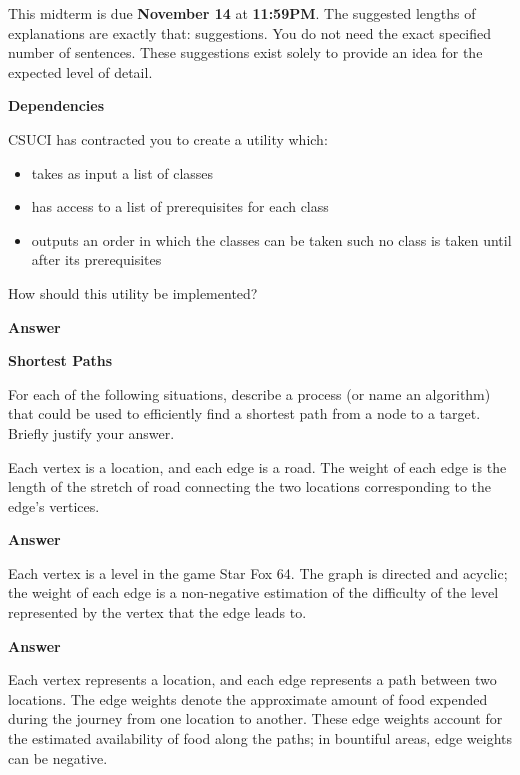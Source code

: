 \documentclass[12pt,twoside]{article}
\newcommand{\answer}{
 \par\medskip
 \textbf{Answer}
}
\newcommand{\answerI}{ \answer

}
\newcommand{\answerIIa}{ \answer

}
\newcommand{\answerIIb}{ \answer

}
\newcommand{\theproblemsetnum}{2}
\newcommand{\releasedate}{November 11, 2020}
\newcommand{\partaduedate}{November 14}
\begin{document}
\handout{Midterm \theproblemsetnum}{\releasedate}

This midterm is due {\bf \partaduedate} at
{\bf 11:59PM}. The suggested lengths of explanations are exactly that: suggestions.
You do not need the exact specified number of sentences. These suggestions
exist solely to provide an idea for the expected level of detail.

\medskip

\hrulefill

\begin{problems}

\problem {} \textbf{Dependencies}

CSUCI has contracted you to create a utility which:

\begin{itemize}
\item takes as input a list of classes
\item has access to a list of prerequisites for each class
\item outputs an order in which the classes can be taken
  such no class is taken until after its prerequisites
\end{itemize}

How should this utility be implemented?

\answerI


\problem {} \textbf{Shortest Paths}

For each of the following situations, describe a  process
(or name an algorithm) that could be used to efficiently 
find a shortest path from a node to a target.
Briefly justify your answer.

\begin{problemparts}
  
  \problempart {}
  Each vertex is a location, and each edge is a road. The weight
  of each edge is the length of the stretch of road connecting
  the two locations corresponding to the edge's vertices.
  
  \answerIIa

  \problempart {}
  Each vertex is a level in the game Star Fox 64. The graph is
  directed and acyclic; the weight of each edge is a non-negative
  estimation of the difficulty of the level represented by the 
  vertex that the edge leads to.

  \answerIIb

  \problempart {}
  Each vertex represents a location, and each edge represents a
  path between two locations. The edge weights denote the
  approximate amount of food expended during the journey from one
  location to another. These edge weights account for the estimated
  availability of food along the paths; in bountiful areas, edge
  weights can be negative.


\end{problemparts}
\end{problems}
\end{document}
